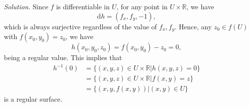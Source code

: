 \documentclass[12pt]{article}
\begin{document}
\textit{Solution.}
Since $f$ is differentiable in $U$, for any point in $U \times \mathbb{R}$, we have \begin{equation*}
    \mathrm dh = (f_x,f_y,-1),
\end{equation*}
which is always surjective regardless of the value of $f_x,f_y$. Hence, any $z_0 \in f(U)$ with $f(x_0,y_0) = z_0$, we have \begin{equation*}
    h(x_0,y_0,z_0) = f(x_0,y_0) - z_0 = 0,
\end{equation*}
being a regular value. This implies that \begin{align*}
    h^{-1}(0) &= \{(x,y,z)\in U\times \mathbb{R}|h(x,y,z)=0\}\\
    &=\{(x,y,z)\in U\times \mathbb{R}|f(x,y)=z\}\\
    &=\{(x,y,f(x,y))|(x,y)\in U\}
\end{align*}
is a regular surface.
\end{document}
